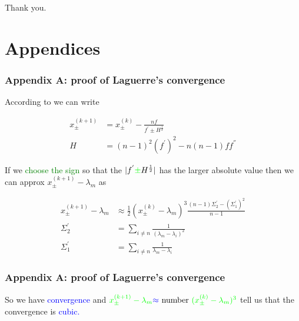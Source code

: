 \documentclass{beamer}
\theoremstyle{definition} \newtheorem{de}{Def}
\theoremstyle{remark} \newtheorem{os}[de]{Remark}
\theoremstyle{plain} \newtheorem{te}[de]{Teo}
\theoremstyle{plain} \newtheorem{co}[de]{Cor}
\theoremstyle{plain} \newtheorem{pr}[de]{Prop}
\theoremstyle{plain} \newtheorem{lem}[de]{Lemm}
\theoremstyle{remark} \newtheorem{rem}[de]{Remark}
\begin{document}
\begin{frame}
  Thank you.
\end{frame}

\section{Appendices}

\begin{frame}[label=LagProof]
  \frametitle{Appendix A: proof of Laguerre's convergence}

  According to \cite[p.444]{bookWilkinson} we can write 

  \begin{align*}
    x_{\pm}^{(k+1)} &= x_{\pm}^{(k)} - \frac{n f}{f^{'} \pm H^{\frac{1}{2}}} \\
    H &= (n-1)^2 (f^{'})^2 -n(n-1)f f^{''}
  \end{align*}

  If we \textcolor{green}{choose the sign} so that the $| f^{'} \textcolor{green}{\pm} H^{\frac{1}{2}} |$ has the larger absolute value then we can approx $x_{\pm}^{(k+1)} - \lambda_m$ as

  \begin{align*}
    x_{\pm}^{(k+1)} - \lambda_m &\approx \frac{1}{2}(x_{\pm}^{(k)} - \lambda_m)^3 \frac{(n-1)\Sigma_2^{'} - (\Sigma_1^{'})^2}{n-1}\\
    \Sigma_2^{'} &= \sum_{i\ne n} \frac{1}{(\lambda_m - \lambda_i)^2}\\
    \Sigma_1^{'} &= \sum_{i\ne n} \frac{1}{\lambda_m - \lambda_i}
  \end{align*}

\end{frame}

\begin{frame}
  \frametitle{Appendix A: proof of Laguerre's convergence}

  So we have \textcolor{blue}{convergence} and $\textcolor{green}{x_{\pm}^{(k+1)} - \lambda_m} \textcolor{blue}{\approx} \text{ number } \textcolor{green}{(x_{\pm}^{(k)} - \lambda_m)^3}$ tell us that the convergence is \textcolor{blue}{cubic.}

  \hyperlink{BeforeLagProof}{}
\end{frame}
\end{document}
